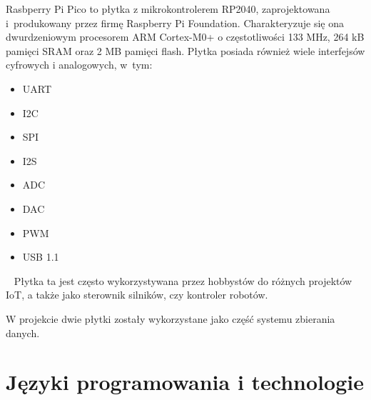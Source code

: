 Rasbperry Pi Pico to płytka z mikrokontrolerem RP2040, zaprojektowana i~produkowany przez firmę Raspberry Pi Foundation. Charakteryzuje się ona dwurdzeniowym procesorem ARM Cortex-M0+ o częstotliwości 133 MHz, 264 kB pamięci SRAM oraz 2 MB pamięci flash. Płytka posiada również wiele interfejsów cyfrowych i analogowych, w~tym:
\begin{itemize}
    \item UART
    \item I2C
    \item SPI
    \item I2S
    \item ADC
    \item DAC
    \item PWM
    \item USB 1.1
\end{itemize}
~\cite{PICO:datasheet,PICO:doc}
Płytka ta jest często wykorzystywana przez hobbystów do różnych projektów IoT, a także jako sterownik silników, czy kontroler robotów.\cite{PICO:doc}

W projekcie dwie płytki zostały wykorzystane jako część systemu zbierania danych.


\section{Języki programowania i technologie}
